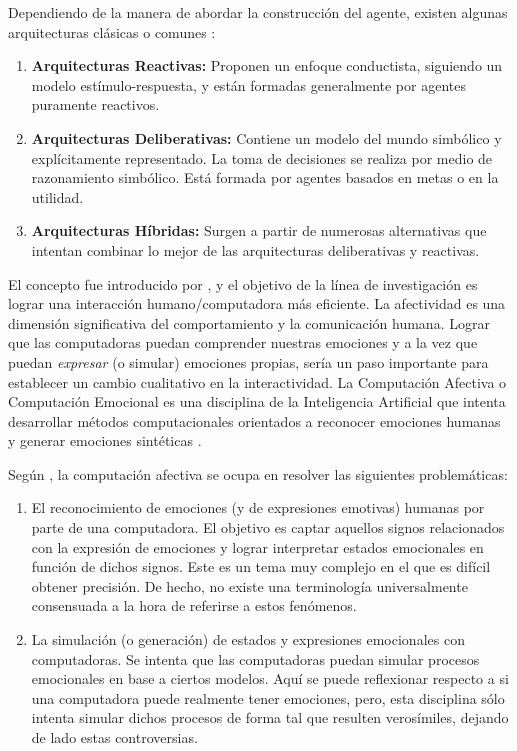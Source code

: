 Dependiendo de la manera de abordar la construcción del agente, existen algunas
arquitecturas clásicas o comunes \citep{perozo2011}:

\begin{enumerate}
\item \textbf{Arquitecturas Reactivas:} Proponen un enfoque conductista, siguiendo un modelo
estímulo-respuesta, y están formadas generalmente por agentes puramente
reactivos.
\item \textbf{Arquitecturas Deliberativas:} Contiene un modelo del mundo
simbólico y explícitamente representado. La toma de decisiones se realiza por
medio de razonamiento simbólico. Está formada por agentes basados en metas o en
la utilidad.
\item \textbf{Arquitecturas Híbridas:} Surgen a partir de numerosas
alternativas que intentan combinar lo mejor de las arquitecturas deliberativas y
reactivas.
\end{enumerate}


El concepto fue introducido por \cite{picard1995}, y el objetivo de la
línea de investigación es lograr una interacción humano/computadora más
eficiente. La afectividad es una dimensión significativa del comportamiento y la
comunicación humana. Lograr que las computadoras puedan comprender nuestras
emociones y a la vez que puedan \textit{expresar} (o simular) emociones propias, sería
un paso importante para establecer un cambio cualitativo en la interactividad.
La Computación Afectiva  o Computación
Emocional es una disciplina de la Inteligencia Artificial que intenta
desarrollar métodos computacionales orientados a reconocer emociones humanas y
generar emociones sintéticas \citep{causa2008}.

Según \cite{causa2008}, la computación afectiva se ocupa en resolver las
siguientes problemáticas:

\begin{enumerate}
\item El reconocimiento de emociones (y de expresiones emotivas)
humanas por parte de una computadora. El objetivo es captar aquellos signos
relacionados con la expresión de emociones y lograr interpretar estados
emocionales en función de dichos signos. Este es un tema muy complejo en el que
es difícil obtener precisión. De hecho, no existe una terminología
universalmente consensuada a la hora de referirse a estos fenómenos.
\item La simulación (o generación) de estados y expresiones emocionales con computadoras.
Se intenta que las computadoras puedan simular procesos emocionales en base a
ciertos modelos. Aquí se puede reflexionar respecto a si una computadora puede
realmente tener emociones, pero, esta disciplina sólo intenta simular dichos
procesos de forma tal que resulten verosímiles, dejando de lado estas
controversias.
\end{enumerate}

